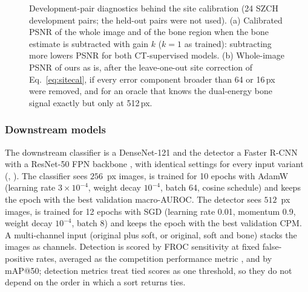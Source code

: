 \begin{figure}[!t]
\centering
{}
\caption{Development-pair diagnostics behind the site calibration (24 SZCH development pairs; the held-out pairs were not used). (a)
Calibrated PSNR of the whole image and of the bone region when the bone estimate is subtracted with gain $k$ ($k=1$ as trained):
subtracting more lowers PSNR for both CT-supervised models. (b) Whole-image PSNR of ours as is, after the leave-one-out site correction of
Eq.~\eqref{eq:sitecal}, if every error component broader than 64 or 16\,px were removed, and for an oracle that knows the dual-energy bone
signal exactly but only at 512\,px.}
\label{fig:sitecal_diag}
\end{figure}

\subsubsection{Downstream models}
The downstream classifier is a DenseNet-121 \cite{huang2017densenet} and the detector a Faster R-CNN with a ResNet-50 FPN backbone
\cite{ren2017fasterrcnn}, with identical settings for every input variant (, ). The classifier sees
$256$~px images, is trained for 10 epochs with AdamW \cite{loshchilov2019adamw} (learning rate $3\times10^{-4}$, weight decay $10^{-4}$,
batch 64, cosine schedule) and keeps the epoch with the best validation macro-AUROC. The detector sees $512$~px images, is trained for 12
epochs with SGD (learning rate 0.01, momentum 0.9, weight decay $10^{-4}$, batch 8) and keeps the epoch with the best validation CPM. A
multi-channel input (original plus soft, or original, soft and bone) stacks the images as channels. Detection is scored by FROC sensitivity
at fixed false-positive rates, averaged as the competition performance metric \cite{vanginneken2010anode09,niemeijer2011cpm}, and by
mAP@50; detection metrics treat tied scores as one threshold, so they do not depend on the order in which a sort returns ties.

